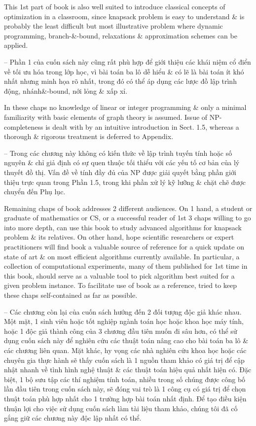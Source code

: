 \documentclass{article}
\begin{document}
\begin{itemize}
    This 1st part of book is also well suited to introduce classical concepts of optimization in a classroom, since knapsack problem is easy to understand \& is probably the least difficult but most illustrative problem where dynamic programming, branch-\&-bound, relaxations \& approximation schemes can be applied.
    
    -- Phần 1 của cuốn sách này cũng rất phù hợp để giới thiệu các khái niệm cổ điển về tối ưu hóa trong lớp học, vì bài toán ba lô dễ hiểu \& có lẽ là bài toán ít khó nhất nhưng minh họa rõ nhất, trong đó có thể áp dụng các lược đồ lập trình động, nhánh\&-bound, nới lỏng \& xấp xỉ.
    
    In these chaps no knowledge of linear or integer programming \& only a minimal familiarity with basic elements of graph theory is assumed. Issue of NP-completeness is dealt with by an intuitive introduction in Sect. 1.5, whereas a thorough \& rigorous treatment is deferred to Appendix.
    
    -- Trong các chương này không có kiến thức về lập trình tuyến tính hoặc số nguyên \& chỉ giả định có sự quen thuộc tối thiểu với các yếu tố cơ bản của lý thuyết đồ thị. Vấn đề về tính đầy đủ của NP được giải quyết bằng phần giới thiệu trực quan trong Phần 1.5, trong khi phần xử lý kỹ lưỡng \& chặt chẽ được chuyển đến Phụ lục.
    
    Remaining chaps of book addresses 2 different audiences. On 1 hand, a student or graduate of mathematics or CS, or a successful reader of 1st 3 chaps willing to go into more depth, can use this book to study advanced algorithms for knapsack problem \& its relatives. On other hand, hope scientific researchers or expert practitioners will find book a valuable source of reference for a quick update on state of art \& on most efficient algorithms currently available. In particular, a collection of computational experiments, many of them published for 1st time in this book, should serve as a valuable tool to pick algorithm best suited for a given problem instance. To facilitate use of book as a reference, tried to keep these chaps self-contained as far as possible.
    
    -- Các chương còn lại của cuốn sách hướng đến 2 đối tượng độc giả khác nhau. Một mặt, 1 sinh viên hoặc tốt nghiệp ngành toán học hoặc khoa học máy tính, hoặc 1 độc giả thành công của 3 chương đầu tiên muốn đi sâu hơn, có thể sử dụng cuốn sách này để nghiên cứu các thuật toán nâng cao cho bài toán ba lô \& các chương liên quan. Mặt khác, hy vọng các nhà nghiên cứu khoa học hoặc các chuyên gia thực hành sẽ thấy cuốn sách là 1 nguồn tham khảo có giá trị để cập nhật nhanh về tình hình nghệ thuật \& các thuật toán hiệu quả nhất hiện có. Đặc biệt, 1 bộ sưu tập các thí nghiệm tính toán, nhiều trong số chúng được công bố lần đầu tiên trong cuốn sách này, sẽ đóng vai trò là 1 công cụ có giá trị để chọn thuật toán phù hợp nhất cho 1 trường hợp bài toán nhất định. Để tạo điều kiện thuận lợi cho việc sử dụng cuốn sách làm tài liệu tham khảo, chúng tôi đã cố gắng giữ các chương này độc lập nhất có thể.
    

\end{itemize}
\end{document}
